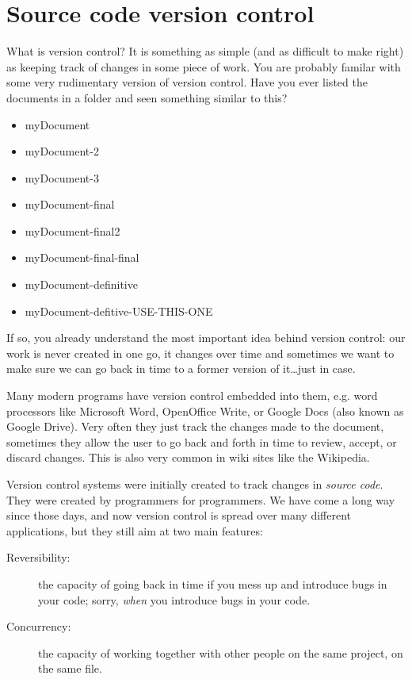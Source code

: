 \section{Source code version control}
\label{sec:source-code-version}

What is version control? It is something as simple (and as difficult
to make right) as keeping track of changes in some piece of work. You
are probably familar with some very rudimentary version of version
control. Have you ever listed the documents in a folder and seen
something similar to this?

\begin{itemize}
\item myDocument
\item myDocument-2
\item myDocument-3
\item myDocument-final
\item myDocument-final2
\item myDocument-final-final
\item myDocument-definitive
\item myDocument-defitive-USE-THIS-ONE
\end{itemize}

If so, you already understand the most important idea behind version
control: our work is never created in one go, it changes over time and
sometimes we want to make sure we can go back in time to a former
version of it\ldots just in case. 

Many modern programs have version control embedded into them,
e.g. word processors like Microsoft Word, OpenOffice Write, or Google
Docs (also known as Google Drive). Very often they just track the
changes made to the document, sometimes they allow the user to go back
and forth in time to review, accept, or discard changes. This is also
very common in wiki sites like the Wikipedia. 


Version control systems were initially created to track changes in
\emph{source code}. They were created by programmers for
programmers. We have come a long way since those days, and now version
control is spread over many different applications, but they still aim
at two main features: 

\begin{description}
\item[Reversibility: ] the capacity of going back in time if you mess
  up and introduce bugs in your code; sorry, \emph{when} you introduce
  bugs in your code.
\item[Concurrency: ] the capacity of working together with other
  people on the same project, on the same file. 
\end{description}

